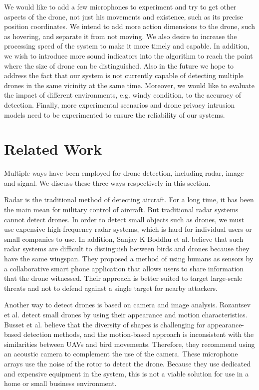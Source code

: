 \documentclass{sig-alternate-10pt}
\begin{document}
We would like to add a few microphones to experiment and try to get other aspects of the drone, not just his movements and existence, such as its precise position coordinates. 
We intend to add more action dimensions to the drone, such as hovering, and separate it from not moving.
We also desire to increase the processing speed of the system to make it more timely and capable. 
In addition, we wish to introduce more sound indicators into the algorithm to reach the point where the size of drone can be distinguished. 
Also in the future we hope to address the fact that our system is not currently capable of detecting multiple drones in the same vicinity at the same time. 
Moreover, we would like to evaluate the impact of different environments, e.g. windy condition, to the accuracy of detection. 
Finally, more experimental scenarios and drone privacy intrusion models need to be experimented to ensure the reliability of our systems.


\section{Related Work}
Multiple ways have been employed for drone detection, including radar, image and signal. We discuss these three ways respectively in this section.

\hspace{1mm} 
Radar is the traditional method of detecting aircraft. For a long time, it has been the main mean for military control of aircraft. But traditional radar systems cannot detect drones. In order to detect small objects such as drones, we must use expensive high-frequency radar systems, which is hard for individual users or small companies to use. In addition, Sanjay K Boddhu et al. believe that such radar systems are difficult to distinguish between birds and drones because they have the same wingspan. They proposed a method of using humans as sensors by a collaborative smart phone application that allows users to share information that the drone witnessed. Their approach is better suited to target large-scale threats and not to defend against a single target for nearby attackers.

\hspace{1mm} 
Another way to detect drones is based on camera and image analysis. Rozantsev et al. detect small drones by using their appearance and motion characteristics. Busset et al. believe that the diversity of  shapes is challenging for appearance-based detection methods, and the motion-based approach is inconsistent with the similarities between UAVs and bird movements. Therefore, they recommend using an acoustic camera to complement the use of the camera. These microphone arrays use the noise of the rotor to detect the drone. Because they use dedicated and expensive equipment in the system, this is not a viable solution for use in a home or small business environment.
\end{document}
